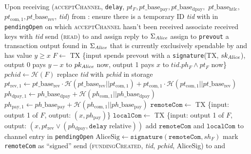 \begin{algorithmic}[1]
    \State Upon receiving (\textsc{acceptChannel}, \texttt{delay}, $pt_F,
    pt\_\mathrm{base}_{\mathrm{pay}}, pt\_\mathrm{base}_{\mathrm{dpay}},$
    $pt\_\mathrm{base}_{\mathrm{htlc}},$ $pt_{\mathrm{com}, 1},
    pt\_\mathrm{base}_{\mathrm{rev}}$, \textit{tid}) from \bob:
    \Indent
      \State ensure there is a temporary ID \textit{tid} with \bob{} in
      \texttt{pendingOpen} on which \textsc{acceptChannel} hasn't been received
      \State associate received keys with \textit{tid}
      \State send (\textsc{read}) to \ledger{} and assign reply to
      $\Sigma_{\mathit{Alice}}$
      \State assign to \texttt{prevout} a transaction output found in
      $\Sigma_{\mathit{Alice}}$ that is currently exclusively spendable by \alice{} and
      has value $y \geq x$
      \State $F \gets$ TX \{input spends prevout with a \texttt{signature}(TX,
      $sk_{\mathit{Alice}}$), output 0 pays $y - x$ to $pk_{\mathit{Alice}}$ now, output 1 pays
      $x$ to $\textit{tid}.ph_F \wedge pt_F$ now\}
      \State $\mathit{pchid} \gets \mathcal{H}\left(F\right)$
      \State replace \textit{tid} with \textit{pchid} in storage
      \State $pt_{\mathrm{rev}, 1} \gets pt\_\mathrm{base}_{\mathrm{rev}} \cdot
      \mathcal{H}\left(pt\_\mathrm{base}_{\mathrm{rev}} ||
      pt_{\mathrm{com}, 1}\right) + pt_{\mathrm{com}, 1} \cdot \mathcal{H}\left(
      pt_{\mathrm{com}, 1} || pt\_\mathrm{base}_{\mathrm{rev}}\right)$
      \State $ph_{\mathrm{dpay}, 1} \gets ph\_\mathrm{base}_{\mathrm{dpay}} +
      \mathcal{H}\left(ph_{\mathrm{com}, 1} ||
      ph\_\mathrm{base}_{\mathrm{dpay}}\right)$
      \State $ph_{\mathrm{pay}, 1} \gets ph\_\mathrm{base}_{\mathrm{pay}} +
      \mathcal{H}\left(ph_{\mathrm{com}, 1} ||
      ph\_\mathrm{base}_{\mathrm{pay}}\right)$
      \State $\mathtt{remoteCom} \gets$ TX \{input: output 1 of $F$, output:
      $\left(x, ph_{\mathrm{pay}}\right)$\}
      \State $\mathtt{localCom} \gets$ TX \{input: output 1 of $F$, output:
      $\left(x, pt_{\mathrm{rev}} \vee \left(ph_{\mathrm{dpay}}, \mathtt{delay}
      \text{ relative}\right)\right)$ 
      \State add $\mathtt{remoteCom}$ and $\mathtt{localCom}$ to channel
      entry in \texttt{pendingOpen}
      \State $\mathrm{AliceSig} \gets
      \mathtt{signature}\left(\mathtt{remoteCom}, sh_F\right)$
      \State mark \texttt{remoteCom} as ``signed''
      \State send (\textsc{fundingCreated}, \textit{tid},
      \textit{pchid}, AliceSig) to \bob{} and \adversary
    \EndIndent
    \State


\end{algorithmic}
